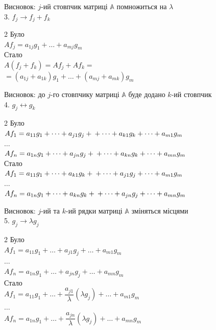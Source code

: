 \documentclass{math_library}
\begin{document}
	Висновок: $j$-ий стовпчик матриці $\mathbb{A}$ помножиться на $\lambda$
	\bigskip \\
	3. $f_j \rightarrow f_j+f_k$
\multicolsep=0pt
	\begin{multicols}{2}
	Було \\
$Af_j = a_{1j}g_1 + \dots + a_{mj}g_m$
	\columnbreak
	\\
	Стало \\
$A(f_j+f_k) = Af_j + Af_k =$\\
$= (a_{1j}+a_{1k})g_1 + \dots + (a_{mj}+a_{mk})g_m$
	\end{multicols}
	Висновок: до $j$-го стовпчику матриці $\mathbb{A}$ буде додано $k$-ий стовпчик
	\bigskip \\
	
	4. $g_j \leftrightarrow g_k$
	\multicolsep=0pt
	\begin{multicols}{2}
	Було \\
	$Af_1 = a_{11}g_1 + \dots + a_{j1}g_j + \\
	+ \dots + a_{k1}g_k + \dots + a_{m1}g_m$ \\
	$\dots$\\
	$Af_n = a_{1n}g_1 + \dots + a_{jn}g_j + \\
	+ \dots + a_{kn}g_k + \dots + a_{mn}g_m$
	\columnbreak
	\\
	Стало \\
	$Af_1 = a_{11}g_1 + \dots + a_{k1}g_k + \\
	+ \dots + a_{j1}g_j + \dots + a_{m1}g_m$ \\
	$\dots$\\
	$Af_n = a_{1n}g_1 + \dots + a_{kn}g_k + \\
	+ \dots + a_{jn}g_j + \dots + a_{mn}g_m$
	\end{multicols}
	Висновок: $j$-ий та $k$-ий рядки матриці $\mathbb{A}$ зміняться місцями
	\bigskip \\
	5. $g_j \rightarrow \lambda g_j$
	\multicolsep=0pt
	\begin{multicols}{2}
	Було \\
	$Af_1 = a_{11}g_1 + \dots + a_{j1}g_j + \dots + a_{m1}g_m$\\
	$\dots$\\
	$Af_n = a_{1n}g_1 + \dots + a_{jn}g_j + \dots + a_{mn}g_m$
	\columnbreak
	\\
	Стало \\
	$Af_1 = a_{11}g_1 + \dots + \dfrac{a_{j1}}{\lambda} (\lambda g_j) + \dots + a_{m1}g_m$\\
	$\dots$\\
	$Af_n = a_{1n}g_1 + \dots + \dfrac{a_{jn}}{\lambda} (\lambda g_j) + \dots + a_{mn}g_m$
	\end{multicols}
\end{document}

